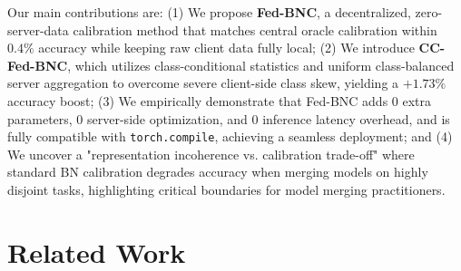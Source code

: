 \documentclass{article}
\theoremstyle{plain}
\theoremstyle{definition}
\theoremstyle{remark}
\begin{document}
Our main contributions are: (1) We propose \textbf{Fed-BNC}, a decentralized, zero-server-data calibration method that matches central oracle calibration within $0.4\%$ accuracy while keeping raw client data fully local; (2) We introduce \textbf{CC-Fed-BNC}, which utilizes class-conditional statistics and uniform class-balanced server aggregation to overcome severe client-side class skew, yielding a $+1.73\%$ accuracy boost; (3) We empirically demonstrate that Fed-BNC adds 0 extra parameters, 0 server-side optimization, and 0 inference latency overhead, and is fully compatible with \texttt{torch.compile}, achieving a seamless deployment; and (4) We uncover a "representation incoherence vs. calibration trade-off" where standard BN calibration degrades accuracy when merging models on highly disjoint tasks, highlighting critical boundaries for model merging practitioners.

\section{Related Work}
\label{sec:related}
\end{document}
